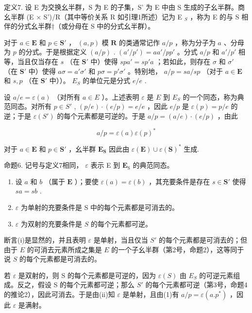 定义7. 设 E 为交换幺半群，S 为 E 的子集，S' 为 E 中由 S 生成的子幺半群。商幺半群 (E × S')/R（其中等价关系 R 如引理1所述）记为 E \(_{S}\) ，称为 E 的与 S 相伴的分式幺半群†（或分母在 S 中的分式幺半群）。

对于 \(a \in \mathbf{E}\) 和 \(p \in \mathbf{S}'\) ， \((a, p)\) 模 \(\mathbf{R}\) 的类通常记作 \(a/p\) ，称为分子为 \(a\) 、分母为 \(p\) 的分式。于是根据定义 \((a/p)\) . \((a'/p') = aa'/pp'\) 。分式 \(a/p\) 和 \(a'/p'\) 相等，当且仅当存在 \(s\) （在 \(\mathbf{S}'\) 中）使得 \(spa' = sp'a\) ；若如此，则存在 \(\sigma\) 和 \(\sigma'\) （在 \(\mathbf{S}'\) 中）使得 \(a\sigma = a'\sigma'\) 和 \(p\sigma = p'\sigma'\) 。特别地， \(a/p = sa/sp\) （对于 \(a \in \mathbf{E}\) 和 \(s, p\) （在 \(\mathbf{S}'\) 中））。 \(E_S\) 的单位元是分式 \(e/e\) .

设 \(a / e = \varepsilon(a)\) （对所有 \(a \in E\) ）。上述表明 \(\varepsilon\) 是 \(E\) 到 \(E_S\) 的一个同态，称为典范同态。对所有 \(p \in S'\) , \((p / e) \cdot (e / p) = e / e\) ，因此 \(e / p\) 是 \(\varepsilon(p) = p / e\) 的逆；于是 \(\varepsilon(S')\) 的每个元素都是可逆的。于是 \(a / p = (a / e) \cdot (e / p)\) ，由此

\[
a / p = \varepsilon (a) \varepsilon (p) ^ {*}\tag{1}
\]

对于 \(a \in \mathbf{E}\) 和 \(p \in \mathbf{S}'\) ，幺半群 \(\mathbf{E}_{\mathbf{S}}\) 因此由 \(\varepsilon(\mathbf{E}) \cup \varepsilon(\mathbf{S})^*\) 生成.

命题6. 记号与定义7相同， \(\varepsilon\) 表示 E 到 \(\mathbf{E}_{\mathrm{S}}\) 的典范同态。

\begin{enumerate}
\def\labelenumi{(\roman{enumi})}
\item
  设 \(a\) 和 \(b\) （属于 \(\mathbf{E}\) ）；要使 \(\varepsilon(a) = \varepsilon(b)\) ，其充要条件是存在 \(s \in \mathbf{S}'\) 使得 \(sa = sb\) .
\item
  \(\varepsilon\) 为单射的充要条件是 S 中的每个元素都是可消去的。
\item
  \(\varepsilon\) 为双射的充要条件是 \(S\) 的每个元素都可逆。
\end{enumerate}

断言(i)是显然的，并且表明 \(\varepsilon\) 是单射，当且仅当 \(S'\) 的每个元素都是可消去的；但由于 \(E\) 的可消去元素所成之集是 \(E\) 的一个子幺半群（第2号，命题2），这等同于说 \(S\) 的每个元素都是可消去的。

若 \(\varepsilon\) 是双射的，则 S 的每个元素都是可逆的，因为 \(\varepsilon(S)\) 由 \(E_{S}\) 的可逆元素组成。反之，假设 S 的每个元素都可逆；那么 \(S'\) 的每个元素都可逆（第3号，命题4的推论2），因此可消去。于是由(ii)知 \(\varepsilon\) 是单射，且由(1)有 \(a/p = \varepsilon(a.p^{*})\) ，因此 \(\varepsilon\) 是满射。

